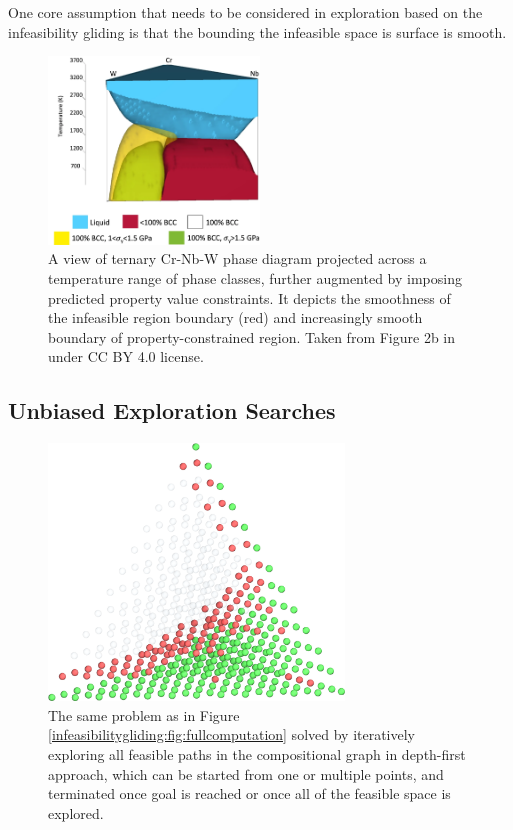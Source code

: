 One core assumption that needs to be considered in exploration based on the infeasibility gliding is that the bounding the infeasible space is surface is smooth. 

\begin{figure}[H]
    \centering
    \includegraphics[width=0.5\textwidth]{infeasibilitygliding/PhaseTernaryMap_Elder2023.png}
    \caption{A view of ternary Cr-Nb-W phase diagram projected across a temperature range of phase classes, further augmented by imposing predicted property value constraints. It depicts the smoothness of the infeasible region boundary (red) and increasingly smooth boundary of property-constrained region. Taken from Figure 2b in \citet{Elder2023ComputationalValidation} under CC BY 4.0 license.}
    \label{infeasibilitygliding:fig:katesphasemap}
\end{figure}


\subsection{Unbiased Exploration Searches} \label{infglide:ssec:unbiasedexplore}

\todo 

\begin{figure}[H]
    \centering
    \includegraphics[width=0.7\textwidth]{infeasibilitygliding/InfeasibilityGliding_Glide.png}
    \caption{The same problem as in Figure \ref{infeasibilitygliding:fig:fullcomputation} solved by iteratively exploring all feasible paths in the compositional graph in depth-first approach, which can be started from one or multiple points, and terminated once goal is reached or once all of the feasible space is explored.}
    \label{infeasibilitygliding:fig:glide}
\end{figure}


\printbibliography[heading=subbibintoc]
